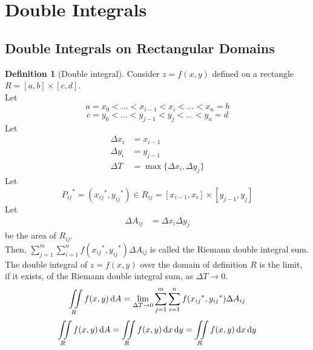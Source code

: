 \documentclass[fleqn, a4paper, 12pt]{article}
\theoremstyle{definition}
\newtheorem{definition}{Definition}
\theoremstyle{theorem}
\theoremstyle{remark}
\begin{document}
\section{Double Integrals}

\subsection{Double Integrals on Rectangular Domains}

\begin{definition}[Double integral]
	Consider $z = f(x,y)$ defined on a rectangle $R = [a,b] \times [c,d]$.\\
	Let
	\begin{equation*}
		a = x_0 < \dots < x_{i-1} < x_i < \dots < x_n = b
	\end{equation*}
	\begin{equation*}
		c = y_0 < \dots < y_{j-1} < y_j < \dots < y_n = d
	\end{equation*}
	Let
	\begin{align*}
		\Delta x_i &= x_{i-1}\\
		\Delta y_i &= y_{j-1}\\
		\Delta T &= \max\{\Delta x_i, \Delta y_j\}
	\end{align*}
	Let 
	\begin{equation*}
		{P_{ij}}^* = ({x_{ij}}^*, {y_{ij}}^*) \in R_{ij} = [x_{i-1},x_i] \times [y_{j-1},y_j]
	\end{equation*}
	Let 
	\begin{align*}
		\Delta A_{ij} &= \Delta x_i \Delta y_j
	\end{align*}
	be the area of $R_{ij}$.\\
	Then, $\displaystyle \sum_{j = 1}^{m} \sum_{i = 1}^{n} f({x_{ij}}^*, {y_{ij}}^*) \Delta A_{ij}$ is called the Riemann double integral sum.\\
	The double integral of $z = f(x,y)$ over the domain of definition $R$ is the limit, if it exists, of the Riemann double integral sum, as $\Delta T \to 0$.
	\begin{equation*}
		\iint\limits_{R} f(x,y) \dif A = \lim\limits_{\Delta T \to 0} \sum_{j = 1}^{m} \sum_{i = 1}^{n} f({x_{ij}}^*, {y_{ij}}^*) \Delta A_{ij}
	\end{equation*}
	\begin{equation*}
		\iint\limits_{R} f(x,y) \dif A = \iint\limits_{R} f(x,y) \dif x \dif y = \iint\limits_{R} f(x,y) \dif x \dif y 
	\end{equation*}
\end{definition}
\end{document}
